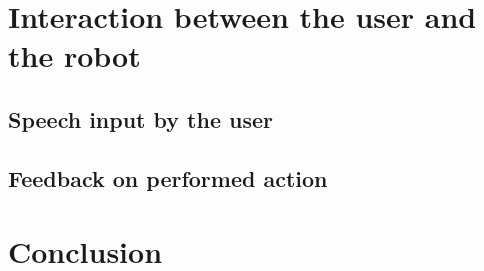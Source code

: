 \documentclass[a4paper,10pt]{article}
\begin{document}
\section{Interaction between the user and the robot}
\subsection{Speech input by the user}

\subsection{Feedback on performed action}

\section{Conclusion}



\end{document}
